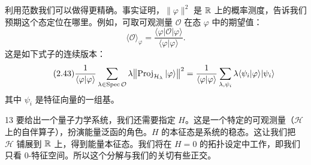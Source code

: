 利用范数我们可以做得更精确。事实证明，$\|\varphi\|^2$ 是 $\mathbb{R}$ 上的概率测度，告诉我们预期这个态定位在哪里。例如，可取可观测量 $\mathcal{O}$ 在态 $\varphi$ 中的期望值：
\begin{equation}\tag{2.42}
\langle\mathcal{O}\rangle_\varphi
=\frac{\langle\varphi|\mathcal{O}|\varphi\rangle}{\langle\varphi|\varphi\rangle}.
\end{equation}
这是如下式子的连续版本：
\begin{equation}\tag{2.43}
\frac{1}{\langle\varphi|\varphi\rangle}
\sum_{\lambda\in\mathrm{Spec}\,\mathcal{O}}
\lambda\bigl\|\operatorname{Proj}_{\mathcal{H}_\lambda}|\varphi\rangle\bigr\|^2
=
\frac{1}{\langle\varphi|\varphi\rangle}
\sum_{\lambda,\psi_i}
\lambda\langle\psi_i|\varphi\rangle|\psi_i\rangle
\end{equation}
其中 $\psi_i$ 是特征向量的一组基。

\begin{srcrem}{13}
要给出一个量子力学系统，我们还需要指定 $H$。这是一个特定的可观测量（$\mathcal{H}$ 上的自伴算子），扮演能量泛函的角色。$H$ 的本征态是系统的稳态。这让我们把 $\mathcal{H}$ 铺展到 $\mathbb{R}$ 上，得到能量本征态。我们将在 $H=0$ 的拓扑设定中工作，即我们只看 $0$-特征空间。所以这个分解与我们的关切有些正交。
\end{srcrem}

